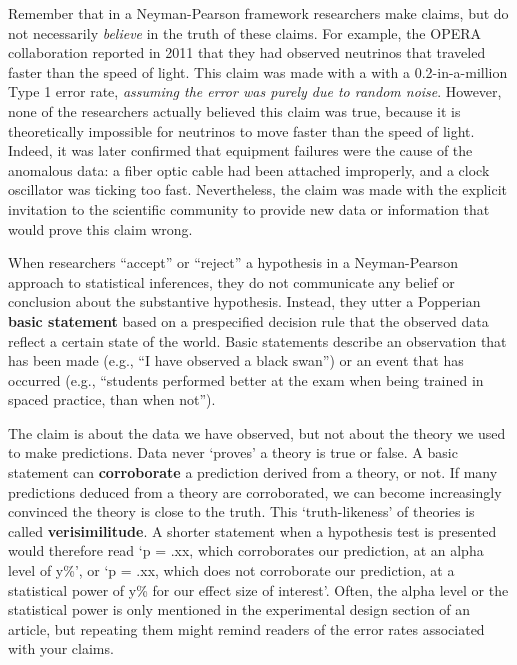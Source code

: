 \documentclass[
]{krantz}
\begin{document}
Remember that in a Neyman-Pearson framework researchers make claims, but do not necessarily \emph{believe} in the truth of these claims. For example, the OPERA collaboration reported in 2011 that they had observed neutrinos that traveled faster than the speed of light. This claim was made with a with a 0.2-in-a-million Type 1 error rate, \emph{assuming the error was purely due to random noise}. However, none of the researchers actually believed this claim was true, because it is theoretically impossible for neutrinos to move faster than the speed of light. Indeed, it was later confirmed that equipment failures were the cause of the anomalous data: a fiber optic cable had been attached improperly, and a clock oscillator was ticking too fast. Nevertheless, the claim was made with the explicit invitation to the scientific community to provide new data or information that would prove this claim wrong.

When researchers ``accept'' or ``reject'' a hypothesis in a Neyman-Pearson approach to statistical inferences, they do not communicate any belief or conclusion about the substantive hypothesis. Instead, they utter a Popperian \textbf{basic statement} based on a prespecified decision rule that the observed data reflect a certain state of the world. Basic statements describe an observation that has been made (e.g., ``I have observed a black swan'') or an event that has occurred (e.g., ``students performed better at the exam when being trained in spaced practice, than when not'').

The claim is about the data we have observed, but not about the theory we used to make predictions. Data never `proves' a theory is true or false. A basic statement can \textbf{corroborate} a prediction derived from a theory, or not. If many predictions deduced from a theory are corroborated, we can become increasingly convinced the theory is close to the truth. This `truth-likeness' of theories is called \textbf{verisimilitude}. A shorter statement when a hypothesis test is presented would therefore read `p = .xx, which corroborates our prediction, at an alpha level of y\%', or `p = .xx, which does not corroborate our prediction, at a statistical power of y\% for our effect size of interest'. Often, the alpha level or the statistical power is only mentioned in the experimental design section of an article, but repeating them might remind readers of the error rates associated with your claims.
\end{document}
